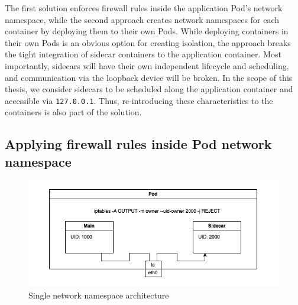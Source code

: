 \documentclass[english, 12pt, a4paper, sci, utf8, a-2b, online]{aaltothesis}
\begin{document}
The first solution enforces firewall rules inside the application Pod's network namespace, while the second approach creates network namespaces for each container by deploying them to their own Pods.
While deploying containers in their own Pods is an obvious option for creating isolation, the approach breaks the tight integration of sidecar containers to the application container.
Most importantly, sidecars will have their own independent lifecycle and scheduling, and communication via the loopback device will be broken.
In the scope of this thesis, we consider sidecars to be scheduled along the application container and accessible via \lstinline{127.0.0.1}.
Thus, re-introducing these characteristics to the containers is also part of the solution.

\subsection{Applying firewall rules inside Pod network namespace}






\begin{figure}[h!]
  \centering
  \includegraphics[width=\linewidth]{files/iptables.png}
  \caption{Single network namespace architecture}
  \label{fig:single-net-solution}
\end{figure}
\end{document}
